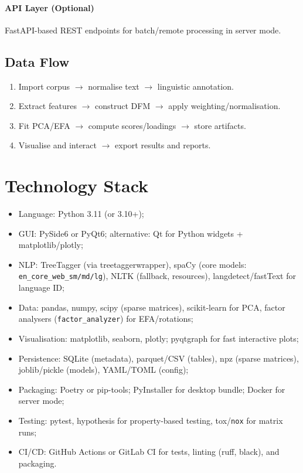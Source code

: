 \paragraph{API Layer (Optional)}
FastAPI-based REST endpoints for batch/remote processing in server mode.

\subsection{Data Flow}
\begin{enumerate}
    \item Import corpus $\rightarrow$ normalise text $\rightarrow$ linguistic annotation.
    \item Extract features $\rightarrow$ construct DFM $\rightarrow$ apply weighting/normalisation.
    \item Fit PCA/EFA $\rightarrow$ compute scores/loadings $\rightarrow$ store artifacts.
    \item Visualise and interact $\rightarrow$ export results and reports.
\end{enumerate}

\section{Technology Stack}
\begin{itemize}
    \item Language: Python 3.11 (or 3.10+);
    \item GUI: PySide6 or PyQt6; alternative: Qt for Python widgets + matplotlib/plotly;
    \item NLP: TreeTagger (via treetaggerwrapper), spaCy (core models: \texttt{en\_core\_web\_sm/md/lg}), NLTK (fallback, resources), langdetect/fastText for language ID;
    \item Data: pandas, numpy, scipy (sparse matrices), scikit-learn for PCA, factor analysers (\texttt{factor\_analyzer}) for EFA/rotations;
    \item Visualisation: matplotlib, seaborn, plotly; pyqtgraph for fast interactive plots;
    \item Persistence: SQLite (metadata), parquet/CSV (tables), npz (sparse matrices), joblib/pickle (models), YAML/TOML (config);
    \item Packaging: Poetry or pip-tools; PyInstaller for desktop bundle; Docker for server mode;
    \item Testing: pytest, hypothesis for property-based testing, tox/\texttt{nox} for matrix runs;
    \item CI/CD: GitHub Actions or GitLab CI for tests, linting (ruff, black), and packaging.
\end{itemize}

